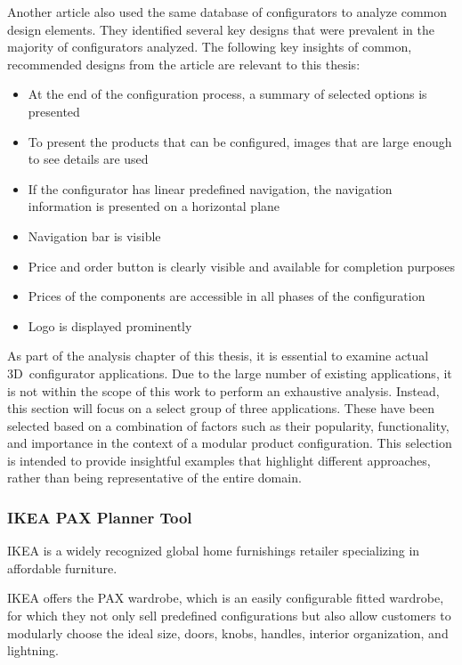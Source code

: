 Another article also used the same database of configurators to analyze common design elements. They identified several key designs that were prevalent in the majority of configurators analyzed. The following key insights of common, recommended designs from the article are relevant to this thesis: \cite{Leitner2014}
\begin{itemize}
    \item At the end of the configuration process, a summary of selected options is presented
    \item To present the products that can be configured, images that are large enough to see details are used
    \item If the configurator has linear predefined navigation, the navigation information is presented on a horizontal plane
    \item Navigation bar is visible
    \item Price and order button is clearly visible and available for completion purposes
    \item Prices of the components are accessible in all phases of the configuration
    \item Logo is displayed prominently
\end{itemize}

As part of the analysis chapter of this thesis, it is essential to examine actual 3D~configurator applications. Due to the large number of existing applications, it is not within the scope of this work to perform an exhaustive analysis. Instead, this section will focus on a select group of three applications. These have been selected based on a combination of factors such as their popularity, functionality, and importance in the context of a modular product configuration. This selection is intended to provide insightful examples that highlight different approaches, rather than being representative of the entire domain.

\subsubsection{IKEA PAX Planner Tool}

IKEA is a widely recognized global home furnishings retailer specializing in affordable furniture. \cite{StatistaIkea}

IKEA offers the PAX wardrobe, which is an easily configurable fitted wardrobe, for which they not only sell predefined configurations but also allow customers to modularly choose the ideal size, doors, knobs, handles, interior organization, and lightning.

